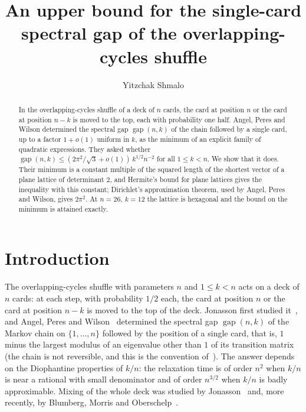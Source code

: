 \documentclass[11pt]{amsart}
\theoremstyle{remark}
\newcommand{\gap}{\operatorname{gap}}
\begin{document}
\title[Single-card gap of the overlapping-cycles shuffle]{An upper bound for the single-card spectral gap of the
overlapping-cycles shuffle}
\author{Yitzchak Shmalo}
\address{Einstein Institute of Mathematics, The Hebrew University of Jerusalem, Jerusalem, Israel}

\begin{abstract}
In the overlapping-cycles shuffle of a deck of $n$ cards, the card at position $n$ or the card at position $n-k$ is
moved to the top, each with probability one half. Angel, Peres and Wilson determined the spectral gap $\gap(n,k)$ of
the chain followed by a single card, up to a factor $1+o(1)$ uniform in $k$, as the minimum of an explicit family of
quadratic expressions. They asked whether $\gap(n,k)\le(2\pi^2/\sqrt3+o(1))\,k^{1/2}n^{-2}$ for all $1\le k<n$. We show
that it does. Their minimum is a constant multiple of the squared length of the shortest vector of a plane lattice of
determinant $2$, and Hermite's bound for plane lattices gives the inequality with this constant; Dirichlet's
approximation theorem, used by Angel, Peres and Wilson, gives $2\pi^2$. At $n=26$, $k=12$ the lattice is hexagonal and the bound on the
minimum is attained exactly.
\end{abstract}

\maketitle

\section{Introduction}\label{sec:intro}

The overlapping-cycles shuffle with parameters $n$ and $1\le k<n$ acts on a deck of $n$ cards: at each step, with
probability $1/2$ each, the card at position $n$ or the card at position $n-k$ is moved to the top of the deck. Jonasson
first studied it~\cite{Jon06}, and Angel, Peres and Wilson~\cite{APW08} determined the
spectral gap $\gap(n,k)$ of the Markov chain on $\{1,\dots,n\}$ followed by the position of a single card, that is,
$1$ minus the largest modulus of an eigenvalue other than $1$ of its transition matrix (the chain is not reversible,
and this is the convention of~\cite{APW08}). The answer
depends on the Diophantine properties of $k/n$: the relaxation time is of order $n^2$ when $k/n$ is near a rational
with small denominator and of order $n^{3/2}$ when $k/n$ is badly approximable. Mixing of the whole deck was studied
by Jonasson~\cite{Jon11} and, more recently, by Blumberg, Morris and Oberschelp~\cite{BMO23}.
\end{document}
